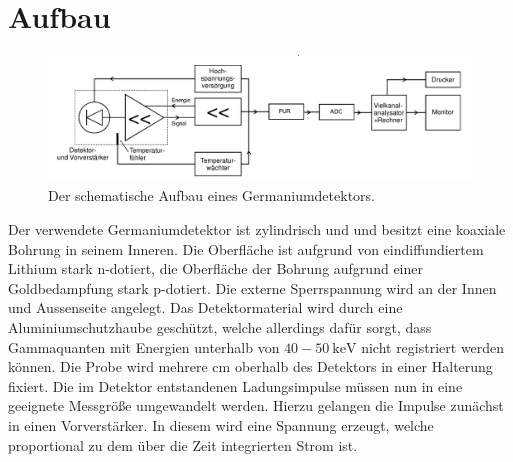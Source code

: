 \section{Aufbau}
\label{sec:Aufbau}

\begin{figure}
	\centering
	\includegraphics[width=\linewidth-100pt,height=\textheight-100pt,keepaspectratio]{content/Images/detektor3.png}
    \caption{Der schematische Aufbau eines Germaniumdetektors\cite{V18}.}
    \label{fig:detektor}
\end{figure}

Der verwendete Germaniumdetektor ist zylindrisch und und besitzt eine koaxiale Bohrung in seinem Inneren. Die Oberfläche ist aufgrund von eindiffundiertem Lithium stark n-dotiert, die Oberfläche der Bohrung aufgrund einer Goldbedampfung stark p-dotiert. Die externe Sperrspannung wird an der Innen und Aussenseite angelegt. Das Detektormaterial wird durch eine Aluminiumschutzhaube geschützt, welche allerdings dafür sorgt, dass Gammaquanten mit Energien unterhalb von $40-\SI{50}{\kilo\electronvolt}$ nicht registriert werden können. Die Probe wird mehrere $\si{\centi\meter}$ oberhalb des Detektors in einer Halterung fixiert. Die im Detektor entstandenen Ladungsimpulse müssen nun in eine geeignete Messgröße umgewandelt werden. Hierzu gelangen die Impulse zunächst in einen Vorverstärker. In diesem wird eine Spannung erzeugt, welche proportional zu dem über die Zeit integrierten Strom ist.

